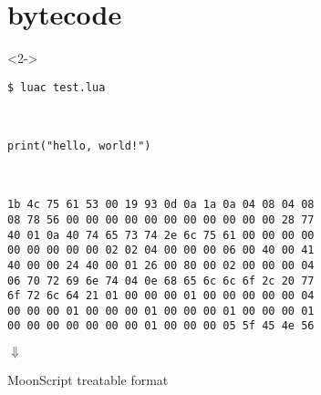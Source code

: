 \section{bytecode}
\begin{frame}[fragile]
\frametitlesec
\begin{center}
	\begin{overlayarea}{.35\textwidth}{.1\textheight}
		\begin{onlyenv}<2->
			\begin{lstlisting}
$ luac test.lua
			\end{lstlisting}
		\end{onlyenv}
	\end{overlayarea}
\end{center}
\bgroup
\begin{minipage}{.05\textwidth}
\ 
\end{minipage}
\begin{minipage}{.34\textwidth}
	\footnotesize

	\begin{lstlisting}[language={[5.3]lua}]
print("hello, world!")
	\end{lstlisting}
\end{minipage}\pause%
\egroup
\begin{minipage}{.16\textwidth}
\ 
\end{minipage}
\bgroup
\begin{minipage}{.43\textwidth}
	\tiny
	\begin{lstlisting}
1b 4c 75 61 53 00 19 93 0d 0a 1a 0a 04 08 04 08
08 78 56 00 00 00 00 00 00 00 00 00 00 00 28 77
40 01 0a 40 74 65 73 74 2e 6c 75 61 00 00 00 00
00 00 00 00 00 02 02 04 00 00 00 06 00 40 00 41
40 00 00 24 40 00 01 26 00 80 00 02 00 00 00 04
06 70 72 69 6e 74 04 0e 68 65 6c 6c 6f 2c 20 77
6f 72 6c 64 21 01 00 00 00 01 00 00 00 00 00 04
00 00 00 01 00 00 00 01 00 00 00 01 00 00 00 01
00 00 00 00 00 00 00 01 00 00 00 05 5f 45 4e 56
\end{lstlisting}
\end{minipage}
\egroup

\pause
\begin{center}
	$\Downarrow$

	MoonScript treatable format
\end{center}
\end{frame}

